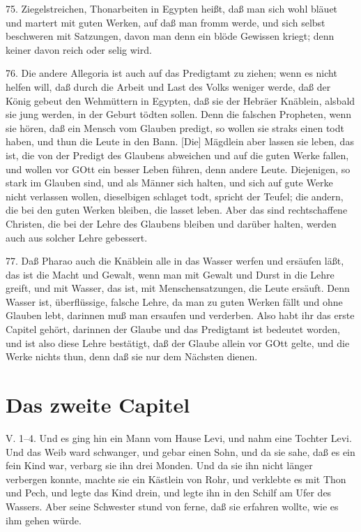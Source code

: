 75. Ziegelstreichen, Thonarbeiten in Egypten heißt, daß man sich wohl bläuet und martert mit guten Werken, auf daß man fromm werde, und
sich selbst beschweren mit Satzungen, davon man denn ein blöde Gewissen kriegt; denn keiner davon reich oder selig wird.

76. Die andere Allegoria ist auch auf das Predigtamt zu ziehen; wenn es nicht helfen will, daß durch die Arbeit und Last des Volks weniger werde, daß der König gebeut den Wehmüttern in Egypten, daß sie der Hebräer Knäblein, alsbald sie jung werden, in der Geburt tödten sollen. Denn die falschen Propheten, wenn sie hören, daß ein Mensch vom Glauben predigt, so wollen sie straks einen todt haben, und thun die Leute in den Bann. [Die] Mägdlein aber lassen sie leben, das ist, die von der Predigt des Glaubens abweichen und auf die guten Werke fallen, und wollen vor GOtt ein besser Leben führen, denn andere Leute. Diejenigen, so stark im Glauben sind, und als Männer sich halten, und sich auf gute Werke nicht verlassen wollen, dieselbigen schlaget todt, spricht der Teufel; die andern, die bei den guten Werken bleiben, die lasset leben. Aber das sind rechtschaffene Christen, die bei der Lehre des Glaubens bleiben und darüber halten, werden auch aus solcher Lehre gebessert.

77. Daß Pharao auch die Knäblein alle in das Wasser werfen und ersäufen läßt, das ist die Macht und Gewalt, wenn man mit Gewalt und Durst in die Lehre greift, und mit Wasser, das ist, mit Menschensatzungen, die Leute ersäuft. Denn Wasser ist, überflüssige, falsche Lehre, da man zu guten Werken fällt und ohne Glauben lebt, darinnen muß man ersaufen und verderben. Also habt ihr das erste Capitel gehört, darinnen der Glaube und das Predigtamt ist bedeutet worden, und ist also diese Lehre bestätigt, daß der Glaube allein vor GOtt gelte, und die Werke nichts thun, denn daß sie nur dem Nächsten dienen.

\section{Das zweite Capitel}

\begin{schriftzitat}
V. 1–4. Und es ging hin ein Mann vom Hause Levi, und nahm eine Tochter Levi. Und das Weib ward schwanger, und gebar einen Sohn, und da sie sahe, daß es ein fein Kind war, verbarg sie ihn drei Monden. Und da sie ihn nicht länger verbergen konnte, machte sie ein Kästlein von Rohr, und verklebte es mit Thon und Pech, und legte das Kind drein, und legte ihn in den Schilf am Ufer des Wassers. Aber seine Schwester stund von ferne, daß sie erfahren wollte, wie es ihm gehen würde.
\end{schriftzitat}

